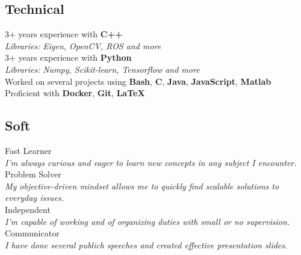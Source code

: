 \documentclass[letterpaper]{soragna-onepage-twocols} %
\begin{document}
\begin{minipage}[t]{0.3\textwidth}
\subsection{Technical}

3+ years experience with \textbf{C++}\\
{\emph{Libraries:} \small\emph{Eigen, OpenCV, ROS and more}}\\
3+ years experience with \textbf{Python}\\
{\emph{Libraries:} \small\emph{Numpy, Scikit-learn, Tensorflow and more}}\\
Worked on several projects using \textbf{Bash}, \textbf{C}, \textbf{Java}, \textbf{JavaScript},  \textbf{Matlab}\\
Proficient with \textbf{Docker}, \textbf{Git}, \textbf{LaTeX}\\

\subsection{Soft}

Fast Learner\\
\emph{I'm always curious and eager to learn new concepts in any subject I encounter.}\\
Problem Solver\\
\emph{My objective-driven mindset allows me to quickly find scalable solutions to everyday issues.}\\
Independent\\
\emph{I'm capable of working and of organizing duties with small or no supervision.}\\
Communicator\\
\emph{I have done several publich speeches and created effective presentation slides.}\\







\end{minipage} %
\hfill
%
\end{document}
